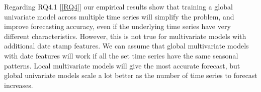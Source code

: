 %


Regarding RQ4.1 [\ref{RQ4}] our empirical results show that training a global univariate model
across multiple time series will simplify the problem, and improve forecasting accuracy, even if the underlying time series
have very different characteristics.
However, this is not true for multivariate models with additional date stamp features.
We can assume that global multivariate models with date features will work if
all the set time series have the same seasonal patterns.
Local multivariate models will give the most accurate forecast, but global univariate
models scale a lot better as the number of time series to forecast increases.



